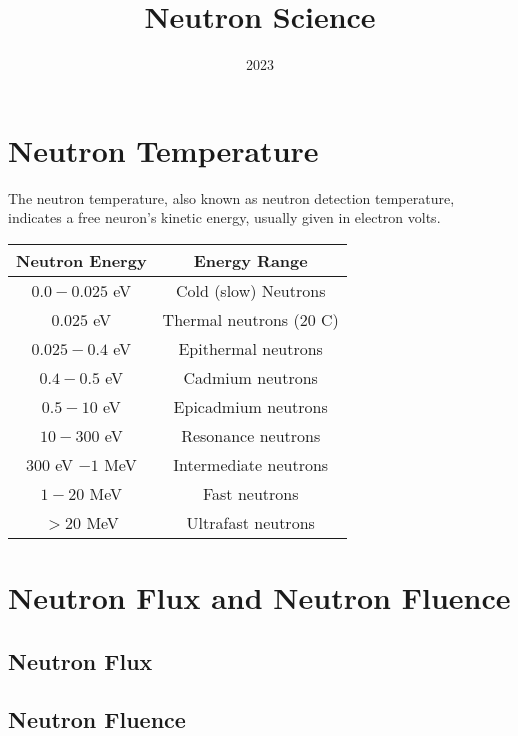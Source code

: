\documentclass{article}
\title{Neutron Science}
\author{}
\date{2023}
\begin{document}
  \maketitle
  \begin{multicols*}{2}
    \section{Neutron Temperature}
    The neutron temperature, also known as neutron detection temperature,
    indicates a free neuron's kinetic energy, usually given in electron volts.\\
    
    \begin{tabular}{|c|c|}
      \hline
      \textbf{Neutron Energy} & \textbf{Energy Range} \\
      \hline
      $0.0 - 0.025$ eV & Cold (slow) Neutrons \\
      $0.025$ eV & Thermal neutrons ($20$ C) \\
      $0.025-0.4$ eV & Epithermal neutrons \\
      $0.4-0.5$ eV & Cadmium neutrons \\
      $0.5-10$ eV & Epicadmium neutrons \\
      $10-300$ eV & Resonance neutrons \\
      $300$ eV $- 1$ MeV & Intermediate neutrons \\
      $1-20$ MeV & Fast neutrons \\
      $> 20$ MeV & Ultrafast neutrons \\
      \hline
    \end{tabular}


    \section{Neutron Flux and Neutron Fluence}
    \subsection{Neutron Flux}
    \subsection{Neutron Fluence}
  \end{multicols*}
\end{document}
